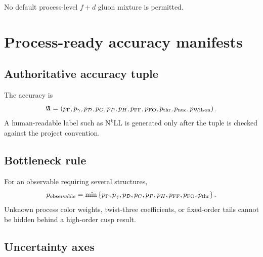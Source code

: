 \documentclass[11pt]{article}
\begin{document}
No default process-level \(f+d\) gluon mixture is permitted.

\section{Process-ready accuracy manifests}
\label{sec:accuracy}

\subsection{Authoritative accuracy tuple}

The accuracy is
\begin{equation}
 \mathfrak A=
 \left(
 p_{\Gamma},
 p_{\gamma},
 p_{\mathcal D},
 p_C,
 p_{P},
 p_H,
 p_{\rm FF},
 p_{\rm FO},
 p_{\rm thr},
 p_{\rm nuc},
 p_{\rm Wilson}
 \right).
 \label{eq:accuracy-tuple}
\end{equation}
A human-readable label such as N\(^{k}\)LL is generated only after the tuple is checked against the project convention.

\subsection{Bottleneck rule}

For an observable requiring several structures,
\begin{equation}
 p_{\rm observable}
 =
 \min
 \left
 \{
 p_{\Gamma},p_{\gamma},p_{\mathcal D},p_C,p_P,p_H,
 p_{\rm FF},p_{\rm FO},p_{\rm thr}
 \right\}.
 \label{eq:bottleneck-rule}
\end{equation}
Unknown process color weights, twist-three coefficients, or fixed-order tails cannot be hidden behind a high-order cusp result.

\subsection{Uncertainty axes}
\end{document}
